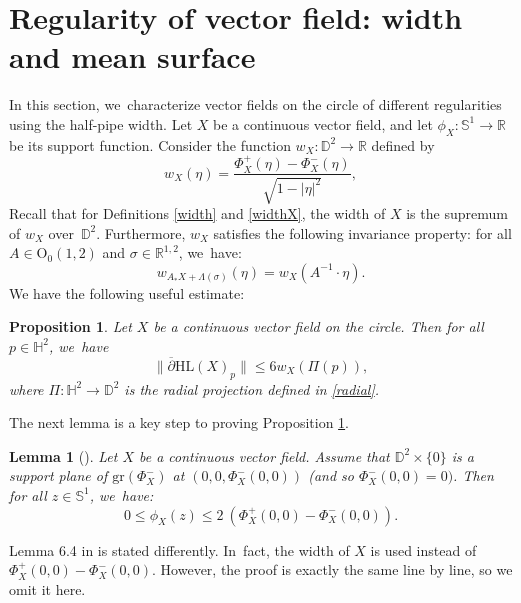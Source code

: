\documentclass[11pt]{article}
\theoremstyle{plain}
\newtheorem{prop}[cor]{Proposition}
\newtheorem{lemma}[cor]{Lemma}
\theoremstyle{definition}
\newcommand{\minko}{\mathbb{R}^{1,2}}
\begin{document}
\section{Regularity of vector field: width and mean surface}\label{sec8_reg}
In this section, we~characterize vector fields on the circle of different regularities using the half-pipe width. Let $X$ be a continuous vector field, and let $\phi_X: \mathbb{S}^1 \to \mathbb{R}$ be its support function. Consider the function $w_X: \mathbb{D}^2 \to \mathbb{R}$ defined by
\begin{equation}\label{w_xz}
w_X(\eta) = \frac{\Phi_X^+(\eta) - \Phi_X^-(\eta)}{\sqrt{1 - \lvert \eta \rvert^2}},
\end{equation}
Recall that for Definitions \ref{width} and \ref{widthX}, the width of $X$ is the supremum of $w_X$ over~$\mathbb{D}^2$. Furthermore, $w_X$ satisfies the following invariance property: for all $A \in \mathrm{O}_0(1,2)$ and $\sigma \in \minko$, we~have:
\begin{equation}\label{eq_width_equivariant}
w_{A_*X+\Lambda(\sigma)}(\eta)=w_{X}(A^{-1}\cdot \eta).
\end{equation}
We have the following useful estimate:
\begin{prop}\label{prop_d_bar_less_width}
Let $X$ be a continuous vector field on the circle. Then for all $p \in \mathbb{H}^2$, we~have
\begin{equation}\label{eqq_d_bar_less_width}
\lVert \overline{\partial}\mathrm{HL}(X)_p \rVert \leq 6 w_X(\Pi(p)),
\end{equation}
where $\Pi: \mathbb{H}^2 \to \mathbb{D}^2$ is the radial projection defined in \eqref{radial}.
\end{prop}

The next lemma is a key step to proving Proposition \ref{prop_d_bar_less_width}.

\begin{lemma}[{\cite[Lem.\,6.4]{diaf2023Infearth}}]\label{simple_resultt}
Let $X$ be a continuous vector field. Assume that $\mathbb{D}^2 \times \{0\}$ is a support plane of $\mathrm{gr}(\Phi_X^-)$ at $(0, 0, \Phi_X^{-}(0, 0))$ (and so $\Phi^-_X(0, 0) = 0)$. Then for all $z \in \mathbb{S}^1$, we~have:
\begin{equation}\label{eq_phi_less_width}
0\leq\phi_X(z)\leq 2 \ (\Phi_X^+(0,0)-\Phi_X^-(0,0)).
\end{equation}
\end{lemma}

Lemma 6.4 in \cite{diaf2023Infearth} is stated differently. In~fact, the width of \(X \) is used instead of \(\Phi_X^+(0,0) - \Phi_X^-(0,0) \). However, the proof is exactly the same line by line, so we omit it here.
\end{document}
